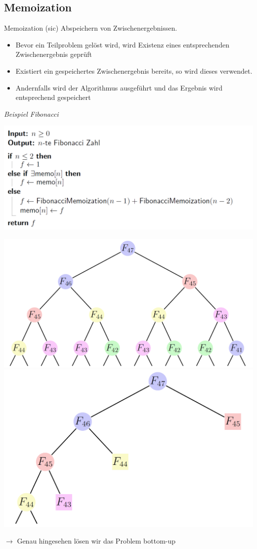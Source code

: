 \begin{sectionbox}
\subsection{Memoization}\smallskip
Memoization (sic) Abspeichern von Zwischenergebnissen.
\begin{itemize}
    \item Bevor ein Teilproblem gelöst wird, wird Existenz eines entsprechenden Zwischenergebnis geprüft
    \item Existiert ein gespeichertes Zwischenergebnis bereits, so wird dieses verwendet.
    \item Andernfalls wird der Algorithmus ausgeführt und das Ergebnis wird entsprechend gespeichert
\end{itemize}\smallskip

\textit{Beispiel Fibonacci}\par
\begin{center}
    \includegraphics[width = \columnwidth]{../img/memo.png}\par\smallskip
    \includegraphics[width = 0.54\columnwidth]{../img/Memo_Fib_schema_vor.png}
    \includegraphics[width = 0.45\columnwidth]{../img/Memo_Fib_schema.png}
\end{center}
$\rightarrow$ Genau hingesehen lösen wir das Problem bottom-up

\end{sectionbox}

